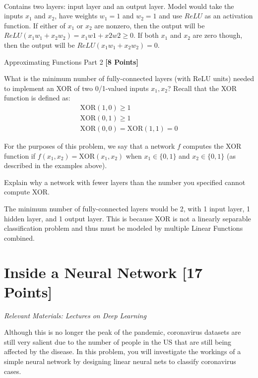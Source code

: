 \begin{subsolution}
  \\
  Contains two layers: input layer and an output layer. Model would take the inputs $x_1$ and $x_2$, have weights $w_1 = 1$ and $w_2 = 1$ and use $ReLU$ as an activation function. If either of $x_1$ or $x_2$ are nonzero, then the output will be $ReLU(x_{1}w_{1} + x_{2}w_{2}) = x_{1}w{1} + x{2}w{2} \geq 0$. If both $x_1$ and $x_2$ are zero though, then the output will be $ReLU(x_{1}w_{1} + x_{2}w_{2}) = 0$.
\end{subsolution}

\problem Approximating Functions Part 2 \textbf{[8 Points]}

What is the minimum number of fully-connected layers (with ReLU units) needed to implement an XOR of two 0/1-valued inputs $x_1, x_2$? Recall that the XOR function is defined as:
\begin{gather*}
\text{XOR}(1, 0) \geq 1 \\
\text{XOR}(0, 1) \geq 1 \\
\text{XOR}(0, 0) = \text{XOR}(1, 1) = 0
\end{gather*}

For the purposes of this problem, we say that a network $f$ computes the XOR function if $f(x_1, x_2) = \text{XOR}(x_1, x_2)$ when $x_1 \in \{0, 1\}$ and $x_2 \in \{0, 1\}$ (as described in the examples above).

Explain why a network with fewer layers than the number you specified cannot compute XOR.


\begin{subsolution}
  The minimum number of fully-connected layers would be 2, with 1 input layer, 1 hidden layer, and 1 output layer. This is because XOR is not a linearly separable classification problem and thus must be modeled by multiple Linear Functions combined.
\end{subsolution}


\newpage
\section{Inside a Neural Network  [17 Points]}

\textit{Relevant Materials: Lectures on Deep Learning}

Although this is no longer the peak of the pandemic, coronavirus datasets are still very salient due to the number of people in the US that are still being affected by the disease. In this problem, you will investigate the workings of a simple neural network by designing linear neural nets to classify coronavirus cases.

